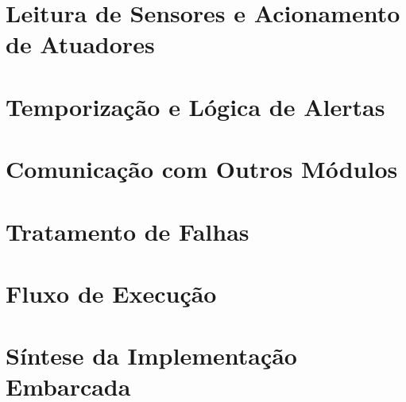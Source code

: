 \section{Leitura de Sensores e Acionamento de Atuadores}
\label{sec:leitura-acionamento}


\section{Temporização e Lógica de Alertas}
\label{sec:temporizacao-alertas}


\section{Comunicação com Outros Módulos}
\label{sec:comunicacao-embarcada}


\section{Tratamento de Falhas}
\label{sec:tratamento-falhas-embarcado}


\section{Fluxo de Execução}
\label{sec:fluxo-execucao}


\section{Síntese da Implementação Embarcada}
\label{sec:sintese-embarcada}

